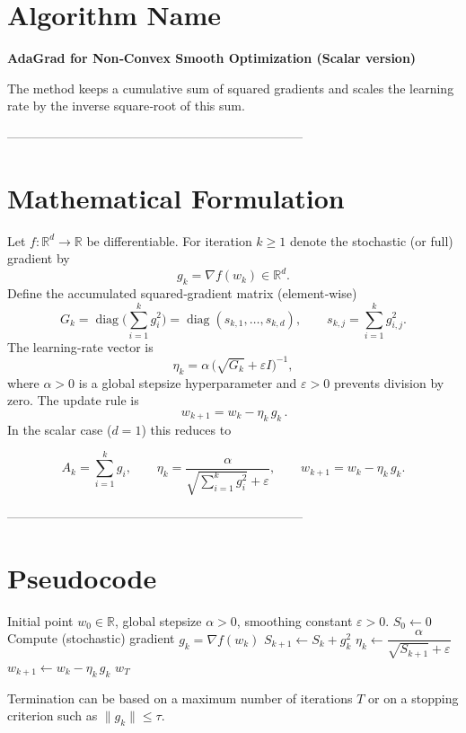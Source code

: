 \documentclass[11pt]{article}
\newcommand{\R}{\mathbb{R}}
\begin{document}
\section*{Algorithm Name}
\textbf{AdaGrad for Non‑Convex Smooth Optimization (Scalar version)}  

The method keeps a cumulative sum of squared gradients and scales the learning
rate by the inverse square‑root of this sum.

-----------------------------------------------------------------------

\section*{Mathematical Formulation}
Let $f:\R^{d}\to\R$ be differentiable.
For iteration $k\ge 1$ denote the stochastic (or full) gradient by 
\[
g_{k}= \nabla f(w_{k})\in\R^{d}.
\]
Define the accumulated squared‑gradient matrix (element‑wise)  
\[
G_{k}= \operatorname{diag}\!\bigl(\sum_{i=1}^{k} g_{i}^{2}\bigr)
      =\operatorname{diag}(s_{k,1},\dots ,s_{k,d}),\qquad 
      s_{k,j}= \sum_{i=1}^{k} g_{i,j}^{2}.
\]
The learning‑rate vector is
\[
\eta_{k}= \alpha\,\bigl(\sqrt{G_{k}}+\varepsilon I\bigr)^{-1},
\]
where $\alpha>0$ is a global stepsize hyperparameter and
$\varepsilon>0$ prevents division by zero.
The update rule is
\[
\boxed{\,w_{k+1}=w_{k}-\eta_{k}\,g_{k}\,}.
\]
In the scalar case ($d=1$) this reduces to  

\[
A_{k}= \sum_{i=1}^{k} g_{i},\qquad
\eta_{k}= \frac{\alpha}{\sqrt{\sum_{i=1}^{k} g_{i}^{2}}+\varepsilon},
\qquad
w_{k+1}= w_{k}-\eta_{k}\,g_{k}.
\]

-----------------------------------------------------------------------

\section*{Pseudocode}
\begin{algorithm}[H]
\caption{AdaGrad (scalar version)}
\begin{algorithmic}[1]
\Require Initial point $w_{0}\in\R$, global stepsize $\alpha>0$, 
        smoothing constant $\varepsilon>0$.
\State $S_{0}\gets 0$ 
    \State Compute (stochastic) gradient $g_{k}= \nabla f(w_{k})$
    \State $S_{k+1}\gets S_{k}+ g_{k}^{2}$                     
    \State $\eta_{k}\gets \dfrac{\alpha}{\sqrt{S_{k+1}}+\varepsilon}$
    \State $w_{k+1}\gets w_{k}-\eta_{k}\,g_{k}$
\EndFor
\State \Return $w_{T}$
\end{algorithmic}
\end{algorithm}
Termination can be based on a maximum number of iterations $T$ or on a
stopping criterion such as $\|g_{k}\|\le \tau$.
\end{document}
